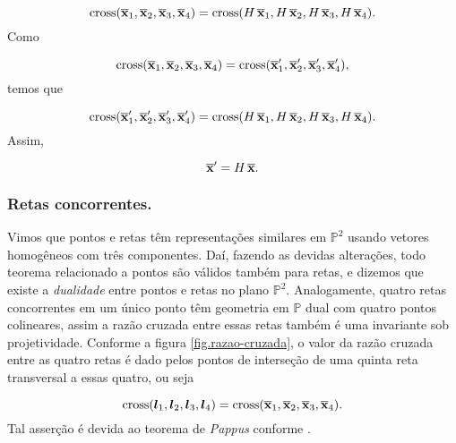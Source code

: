 \begin{equation*}
\text{cross}(\overline{\mathbf{x}}_1,\overline{\mathbf{x}}_2,\overline{\mathbf{x}}_3,\overline{\mathbf{x}}_4)=\text{cross}(H\,\overline{\mathbf{x}}_1,H\,\overline{\mathbf{x}}_2,H\,\overline{\mathbf{x}}_3,H\,\overline{\mathbf{x}}_4).
\end{equation*}
Como

\begin{equation*}
\text{cross}(\overline{\mathbf{x}}_1,\overline{\mathbf{x}}_2,\overline{\mathbf{x}}_3,\overline{\mathbf{x}}_4)=\text{cross}(\overline{\mathbf{x}}'_1,\overline{\mathbf{x}}'_2,\overline{\mathbf{x}}'_3,\overline{\mathbf{x}}'_4),
\end{equation*}
temos que

\begin{equation*}
\text{cross}(\overline{\mathbf{x}}'_1,\overline{\mathbf{x}}'_2,\overline{\mathbf{x}}'_3,\overline{\mathbf{x}}'_4)=\text{cross}(H\,\overline{\mathbf{x}}_1,H\,\overline{\mathbf{x}}_2,H\,\overline{\mathbf{x}}_3,H\,\overline{\mathbf{x}}_4).
\end{equation*}
Assim,

\begin{equation*}
\overline{\mathbf{x}}'=H\,\overline{\mathbf{x}}.
\end{equation*}







\subsubsection*{Retas concorrentes.}
Vimos que pontos e retas têm representações similares em ${\mathbb{P}^2}$ usando vetores homogêneos com três componentes. Daí, fazendo as devidas alterações, todo teorema relacionado a pontos são válidos também para retas, e dizemos que existe a {\it dualidade} entre pontos e retas no plano ${\mathbb{P}^2}$. Analogamente,  
quatro retas concorrentes em um único ponto têm geometria em ${\mathbb{P}}$ dual com quatro pontos colineares, assim a razão cruzada entre essas retas também é uma invariante sob projetividade. Conforme a figura \ref{fig.razao-cruzada}, o valor da razão cruzada entre as quatro retas é dado pelos pontos de interseção de uma quinta reta transversal a essas quatro, ou seja

\begin{equation*}
\text{cross}(\boldsymbol{l}_1,\boldsymbol{l}_2,\boldsymbol{l}_3,\boldsymbol{l}_4)=\text{cross}(\overline{\mathbf{x}}_1,\overline{\mathbf{x}}_2,\overline{\mathbf{x}}_3,\overline{\mathbf{x}}_4).
\end{equation*}
Tal asserção é devida ao teorema de \textit{Pappus} conforme \citep{springer64}. 



